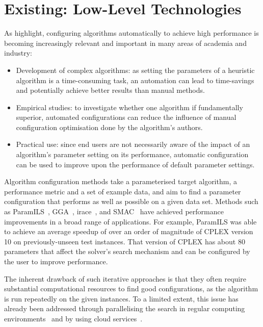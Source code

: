 \documentclass{article}
\begin{document}
\section{Existing: Low-Level Technologies}\label{sec:previous}

As \citet{DBLP:journals/jair/HutterHLS09} highlight, configuring algorithms automatically to achieve high performance is becoming increasingly relevant and important in many areas of academia and industry:

\begin{itemize}
	\item Development of complex algorithms: as setting the parameters of a heuristic algorithm is a time-consuming task, an automation can lead to time-savings and potentially achieve better results than manual methods.
	\item Empirical studies: to investigate whether one algorithm if fundamentally superior, automated configurations can reduce the influence of manual configuration optimisation done by the algorithm's authors.
	\item Practical use: since end users are not necessarily aware of the impact of an algorithm's parameter setting on its performance, automatic configuration can be used to improve upon the performance of default parameter settings.
\end{itemize}

Algorithm configuration methods take a parameterised target algorithm, a performance metric and a set of example data, and aim to find a parameter configuration that performs as well as possible on a given data set. 
Methods such as ParamILS~\cite{DBLP:journals/jair/HutterHLS09}, GGA~\cite{Ansotegui2009genderbasedga}, irace~\cite{Birattari2010irace}, and SMAC~\cite{Hutter2011smac} have achieved performance improvements in a broad range of applications. For example, ParamILS was able to achieve an average speedup of over an order of magnitude of CPLEX version 10 on previously-unseen test instances. That version of CPLEX has about 80 parameters that affect the solver’s search mechanism and can be configured by the user to improve performance. 

The inherent drawback of such iterative approaches is that they often require substantial computational resources to find good configurations, as the algorithm is run repeatedly on the given instances.  
To a limited extent, this issue has already been addressed through parallelising the search in regular computing environments~\cite{Hutter2012parallel} and by using cloud services~\cite{Geschwender2014cloud}. 
\end{document}

